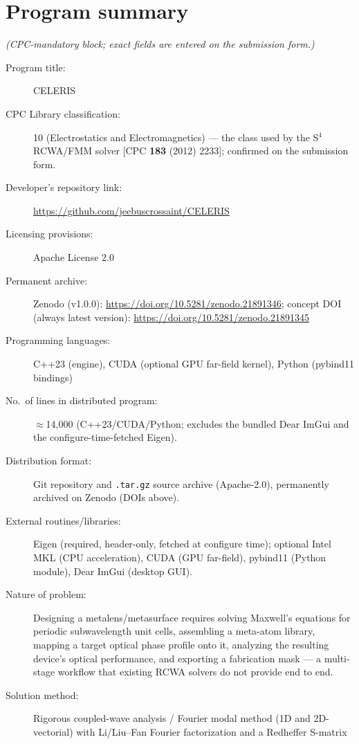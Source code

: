 \documentclass[preprint,12pt]{elsarticle}
\begin{document}
\section*{Program summary}
\noindent\emph{(CPC-mandatory block; exact fields are entered on the submission form.)}
\begin{description}
\item[Program title:] CELERIS
\item[CPC Library classification:] 10 (Electrostatics and Electromagnetics) --- the
      class used by the S$^4$ RCWA/FMM solver [CPC \textbf{183} (2012) 2233];
      confirmed on the submission form.
\item[Developer's repository link:] \url{https://github.com/jeebuscrossaint/CELERIS}
\item[Licensing provisions:] Apache License 2.0
\item[Permanent archive:] Zenodo (v1.0.0): \url{https://doi.org/10.5281/zenodo.21891346};
      concept DOI (always latest version): \url{https://doi.org/10.5281/zenodo.21891345}
\item[Programming languages:] C++23 (engine), CUDA (optional GPU far-field kernel),
      Python (pybind11 bindings)
\item[No.\ of lines in distributed program:] $\approx$14{,}000 (C++23/CUDA/Python;
      excludes the bundled Dear ImGui and the configure-time-fetched Eigen).
\item[Distribution format:] Git repository and \texttt{.tar.gz} source archive
      (Apache-2.0), permanently archived on Zenodo (DOIs above).
\item[External routines/libraries:] Eigen (required, header-only, fetched at configure
      time); optional Intel MKL (CPU acceleration), CUDA (GPU far-field), pybind11
      (Python module), Dear ImGui (desktop GUI).
\item[Nature of problem:] Designing a metalens/metasurface requires solving Maxwell's
      equations for periodic subwavelength unit cells, assembling a meta-atom library,
      mapping a target optical phase profile onto it, analyzing the resulting device's
      optical performance, and exporting a fabrication mask --- a multi-stage workflow
      that existing RCWA solvers do not provide end to end.
\item[Solution method:] Rigorous coupled-wave analysis / Fourier modal method (1D and
      2D-vectorial) with Li/Liu--Fan Fourier factorization and a Redheffer S-matrix

\end{description}
\end{document}
